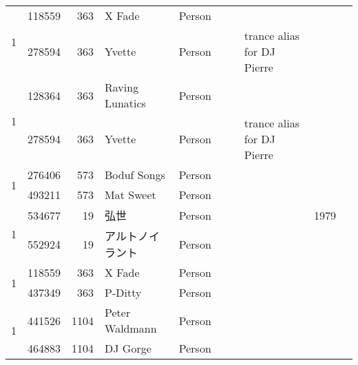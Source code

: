 \begin{tabular}{|r|rrlllllrr|}
\hline
\multirow{2}{*}{1} & 118559 &       363 & X Fade            & Person &                &          &                                                &              &            \\
         & 278594 &       363 & Yvette            & Person &                &          & trance alias for DJ Pierre                     &              &            \\
\hline
\multirow{2}{*}{1} & 128364 &       363 & Raving Lunatics   & Person &                &          &                                                &              &            \\
         & 278594 &       363 & Yvette            & Person &                &          & trance alias for DJ Pierre                     &              &            \\
\hline
\multirow{2}{*}{1} & 276406 &       573 & Boduf Songs       & Person &                &          &                                                &              &            \\
         & 493211 &       573 & Mat Sweet         & Person &                &          &                                                &              &            \\
\hline
\multirow{2}{*}{1} & 534677 &        19 & 弘世                & Person &                &          &                                                &         1979 &            \\
         & 552924 &        19 & アルトノイラント          & Person &                &          &                                                &              &            \\
\hline
\multirow{2}{*}{1} & 118559 &       363 & X Fade            & Person &                &          &                                                &              &            \\
         & 437349 &       363 & P-Ditty           & Person &                &          &                                                &              &            \\
\hline
\multirow{2}{*}{1} & 441526 &      1104 & Peter Waldmann    & Person &                &          &                                                &              &            \\
         & 464883 &      1104 & DJ Gorge          & Person &                &          &                                                &              &            \\
\hline
\end{tabular}
